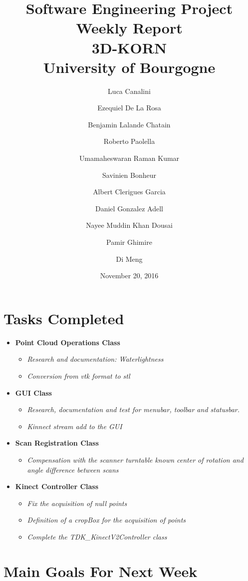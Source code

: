 \documentclass[11pt]{article} %
\title{Software Engineering Project Weekly Report\\ \textbf{3D-KORN} \\ University of Bourgogne}
\author{Luca Canalini \and Ezequiel De La Rosa \and Benjamin Lalande Chatain \and Roberto Paolella \and Umamaheswaran Raman Kumar \and Savinien Bonheur \and Albert Clerigues Garcia \and Daniel Gonzalez Adell \and Nayee Muddin Khan Dousai \and Pamir Ghimire \and Di Meng
}
\date{November 20, 2016} %
\begin{document}
\maketitle
\newpage

\section{Tasks Completed}

\begin{itemize}

\item \textbf{Point Cloud Operations Class}
\begin{itemize}
\item \textit{Research and documentation: Waterlightness}
\item \textit{Conversion from vtk format to stl}
\end{itemize}

\item \textbf{GUI Class}
\begin{itemize}
\item \textit{Research, documentation and test for menubar, toolbar and statusbar.}
\item \textit{Kinnect stream add to the GUI}
\end{itemize}

\item \textbf{Scan Registration Class}
\begin{itemize}
\item \textit{Compensation with the scanner turntable known center of rotation and angle difference between scans}
\end{itemize}

\item \textbf{Kinect Controller Class}
\begin{itemize}
\item \textit{Fix the acquisition of null points}
\item \textit{Definition of a cropBox for the acquisition of points}
\item \textit{Complete the TDK\_KinectV2Controller class}
\end{itemize}

\end{itemize}

\section{Main Goals For Next Week}
\end{document}
